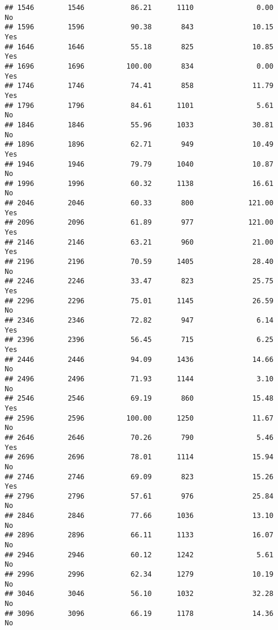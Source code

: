 \documentclass[
]{article}
\begin{document}
\begin{verbatim}
## 1546        1546           86.21      1110               0.00                No
## 1596        1596           90.38       843              10.15               Yes
## 1646        1646           55.18       825              10.85               Yes
## 1696        1696          100.00       834               0.00               Yes
## 1746        1746           74.41       858              11.79               Yes
## 1796        1796           84.61      1101               5.61                No
## 1846        1846           55.96      1033              30.81                No
## 1896        1896           62.71       949              10.49               Yes
## 1946        1946           79.79      1040              10.87                No
## 1996        1996           60.32      1138              16.61                No
## 2046        2046           60.33       800             121.00               Yes
## 2096        2096           61.89       977             121.00               Yes
## 2146        2146           63.21       960              21.00               Yes
## 2196        2196           70.59      1405              28.40                No
## 2246        2246           33.47       823              25.75               Yes
## 2296        2296           75.01      1145              26.59                No
## 2346        2346           72.82       947               6.14               Yes
## 2396        2396           56.45       715               6.25               Yes
## 2446        2446           94.09      1436              14.66                No
## 2496        2496           71.93      1144               3.10                No
## 2546        2546           69.19       860              15.48               Yes
## 2596        2596          100.00      1250              11.67                No
## 2646        2646           70.26       790               5.46               Yes
## 2696        2696           78.01      1114              15.94                No
## 2746        2746           69.09       823              15.26               Yes
## 2796        2796           57.61       976              25.84                No
## 2846        2846           77.66      1036              13.10                No
## 2896        2896           66.11      1133              16.07                No
## 2946        2946           60.12      1242               5.61                No
## 2996        2996           62.34      1279              10.19                No
## 3046        3046           56.10      1032              32.28                No
## 3096        3096           66.19      1178              14.36                No

\end{verbatim}
\end{document}
